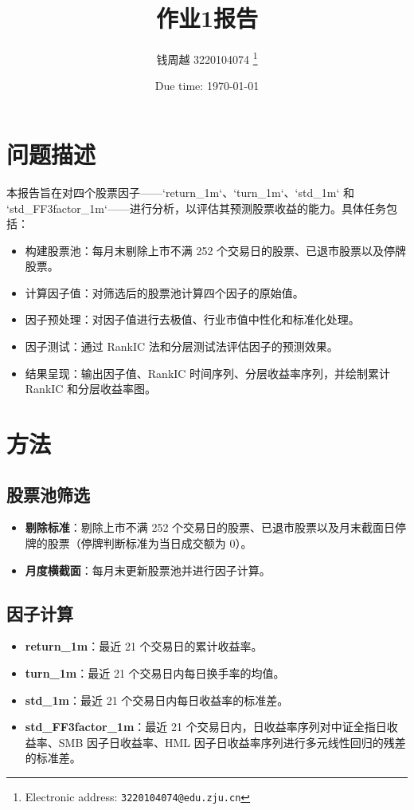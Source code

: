 \documentclass[a4paper]{article}
\begin{document}
\title{作业1报告}

\author{钱周越 3220104074
  \thanks{Electronic address: \texttt{3220104074@edu.zju.cn}}}
  


\date{Due time: \today}

\maketitle

\section{问题描述}
本报告旨在对四个股票因子——`return\_1m`、`turn\_1m`、`std\_1m` 和 `std\_FF3factor\_1m`——进行分析，以评估其预测股票收益的能力。具体任务包括：
\begin{itemize}
    \item 构建股票池：每月末剔除上市不满 252 个交易日的股票、已退市股票以及停牌股票。
    \item 计算因子值：对筛选后的股票池计算四个因子的原始值。
    \item 因子预处理：对因子值进行去极值、行业市值中性化和标准化处理。
    \item 因子测试：通过 RankIC 法和分层测试法评估因子的预测效果。
    \item 结果呈现：输出因子值、RankIC 时间序列、分层收益率序列，并绘制累计 RankIC 和分层收益率图。
\end{itemize}

\section{方法}

\subsection{股票池筛选}
\begin{itemize}
    \item \textbf{剔除标准}：剔除上市不满 252 个交易日的股票、已退市股票以及月末截面日停牌的股票（停牌判断标准为当日成交额为 0）。
    \item \textbf{月度横截面}：每月末更新股票池并进行因子计算。
\end{itemize}

\subsection{因子计算}
\begin{itemize}
    \item \textbf{return\_1m}：最近 21 个交易日的累计收益率。
    \item \textbf{turn\_1m}：最近 21 个交易日内每日换手率的均值。
    \item \textbf{std\_1m}：最近 21 个交易日内每日收益率的标准差。
    \item \textbf{std\_FF3factor\_1m}：最近 21 个交易日内，日收益率序列对中证全指日收益率、SMB 因子日收益率、HML 因子日收益率序列进行多元线性回归的残差的标准差。
\end{itemize}
\end{document}

